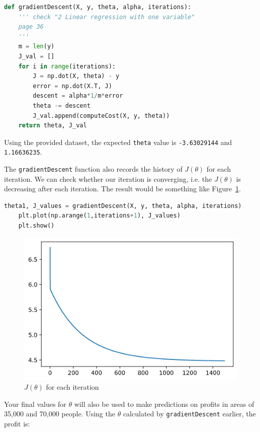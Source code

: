\documentclass[12pt]{article}
\begin{document}
\begin{lstlisting}[language=Python]
def gradientDescent(X, y, theta, alpha, iterations):
    ''' check "2 Linear regression with one variable"
    page 36
    '''
    m = len(y)
    J_val = []
    for i in range(iterations):
        J = np.dot(X, theta) - y
        error = np.dot(X.T, J)
        descent = alpha*1/m*error
        theta -= descent
        J_val.append(computeCost(X, y, theta))
    return theta, J_val
\end{lstlisting}

Using the provided dataset, the expected \texttt{theta} value is \texttt{-3.63029144} and \texttt{1.16636235}.

The \texttt{gradientDescent} function also records the history of $J(\theta)$ for each iteration. We can check whether our iteration is converging, i.e. the $J(\theta)$ is decreasing after each iteration. The result would be something like Figure~\ref{fig:cost}.

\begin{lstlisting}[language=Python]
    theta1, J_values = gradientDescent(X, y, theta, alpha, iterations)
    plt.plot(np.arange(1,iterations+1), J_values)
    plt.show()
\end{lstlisting}

\begin{figure}[h!]
  \centering
  \includegraphics[scale=0.6]{cost.png}
  \caption{$J(\theta)$ for each iteration}
  \label{fig:cost}
\end{figure}

Your final values for $\theta$ will also be used to make predictions on profits in areas of 35,000 and 70,000 people. Using the $\theta$ calculated by \texttt{gradientDescent} earlier, the profit is:
\end{document}
